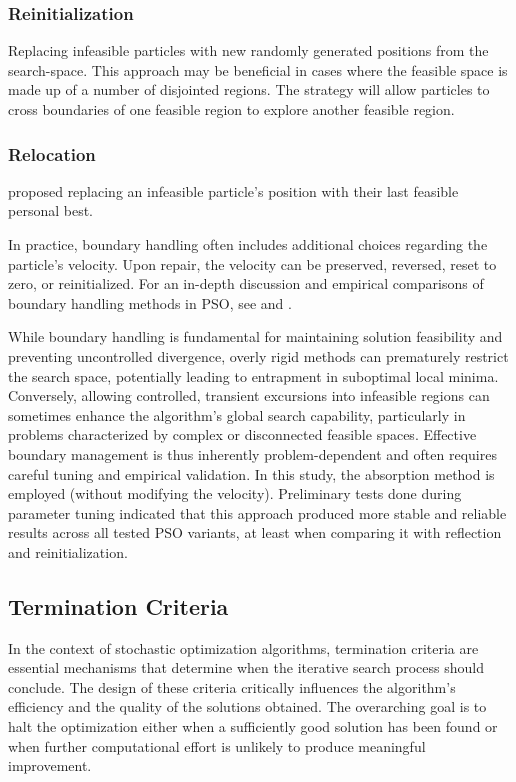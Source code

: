 {\subsubsection{Reinitialization}
    Replacing infeasible particles with new randomly generated positions from the \gls{search-space}. This approach may be beneficial in cases where the feasible space is made up of a number of disjointed regions. The strategy will allow particles to cross boundaries of one feasible region to explore another feasible region.
\subsubsection{Relocation}
     \citet{elgallad2002enhancing}  proposed replacing an infeasible particle’s position  with their last feasible personal best.

\vspace{.935em}


In practice, boundary handling often includes additional choices regarding the particle's velocity. Upon repair, the velocity can be preserved, reversed, reset to zero, or reinitialized. For an in-depth discussion and empirical comparisons of boundary handling methods in PSO, see \citep{chu2011handling} and \citep{padhye2013boundary}.

While boundary handling is fundamental for maintaining solution feasibility and preventing uncontrolled divergence, overly rigid methods can prematurely restrict the search space, potentially leading to entrapment in suboptimal local minima. Conversely, allowing controlled, transient excursions into infeasible regions can sometimes enhance the algorithm's global search capability, particularly in problems characterized by complex or disconnected feasible spaces. Effective boundary management is thus inherently problem-dependent and often requires careful tuning and empirical validation.
In this study, the absorption method is employed (without modifying the velocity). Preliminary tests done during parameter tuning indicated that this approach produced more stable and reliable results across all tested PSO variants, at least when comparing it with reflection and reinitialization.


\subsection{Termination Criteria}

In the context of stochastic optimization algorithms, termination criteria are essential mechanisms that determine when the iterative search process should conclude. The design of these criteria critically influences the algorithm’s efficiency and the quality of the solutions obtained. The overarching goal is to halt the optimization either when a sufficiently good solution has been found or when further computational effort is unlikely to produce meaningful improvement.

}
